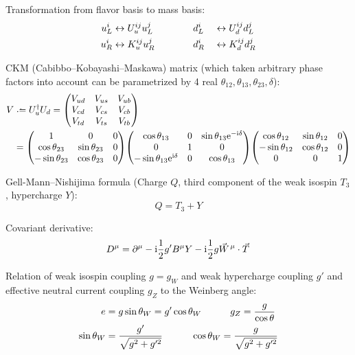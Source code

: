 			\noindent
			Transformation from flavor basis to mass basis:
			\begin{alignat}{3}
				u_L^i &\leftrightarrow U^{ij}_u u_L^j
				\hspace{30pt} && d_L^i &&\leftrightarrow U^{ij}_d d_L^j
				\\
				u_R^i &\leftrightarrow K^{ij}_u u_R^j
				\hspace{30pt} && d_R^i &&\leftrightarrow K^{ij}_d d_R^j
			\end{alignat}

			\noindent
			CKM (Cabibbo--Kobayashi--Maskawa) matrix (which taken arbitrary phase factors into account can be parametrized by 4 real \dof $\theta_{12}, \theta_{13}, \theta_{23}, \delta$):
			\begin{equation}
				\begin{aligned}
					V &\defeq U_u^\dagger U_d = \mqty(V_{ud} & V_{us} & V_{ub} \\ V_{cd} & V_{cs} & V_{cb} \\ V_{td} & V_{ts} & V_{tb}) \\
					&= \mqty(
					1 & 0 & 0 \\
					\cos\theta_{23} & \sin\theta_{23} & 0 \\
					-\sin\theta_{23} & \cos\theta_{23} & 0)
					\mqty(
					\cos\theta_{13} & 0 & \sin\theta_{13} \ex^{-\i\delta} \\
					0 & 1 & 0 \\
					-\sin\theta_{13} \ex^{\i\delta} & 0 & \cos\theta_{13})
					\mqty(
					\cos\theta_{12} & \sin\theta_{12} & 0 \\
					-\sin\theta_{12} & \cos\theta_{12} & 0 \\
					0 & 0 & 1)
				\end{aligned}
			\end{equation}

			\noindent
			Gell-Mann--Nishijima formula (Charge $Q$, third component of the weak isospin $T_3$, hypercharge $Y$):
			\begin{equation}
				\label{Eq:GellMannNishijima}
				Q = T_3 + Y
			\end{equation}

			\noindent
			Covariant derivative:
			\begin{equation}
				D^\mu = \partial^\mu - \i \frac{1}{2} g' B^\mu Y - \i \frac{1}{2} g \vec{W}^\mu \cdot \vec{T}
			\end{equation}

			\noindent
			Relation of weak isospin coupling $g=g_W$ and weak hypercharge coupling $g'$ and effective neutral current coupling $g_Z$ to the Weinberg angle:
			\begin{align}
				e &= g \sin\theta_W = g' \cos\theta_W
				\hspace{30pt} g_Z = \frac{g}{\cos\theta} \\
				\sin \theta_W &= \frac{g'}{\sqrt{g^2 + g'^2}}
				\hspace{30pt} \cos \theta_W = \frac{g}{\sqrt{g^2 + g'^2}}
			\end{align}

